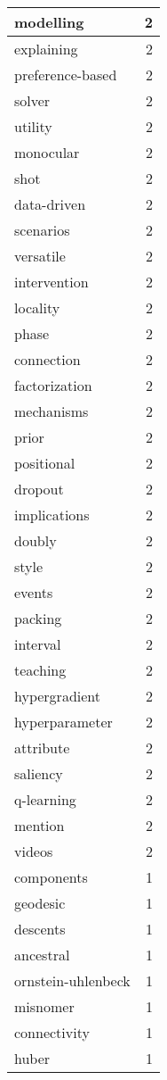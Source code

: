 \begin{table}[h]
\begin{tabular}{|l|r|}
modelling & 2 \\
\hline
explaining & 2 \\
\hline
preference-based & 2 \\
\hline
solver & 2 \\
\hline
utility & 2 \\
\hline
monocular & 2 \\
\hline
shot & 2 \\
\hline
data-driven & 2 \\
\hline
scenarios & 2 \\
\hline
versatile & 2 \\
\hline
intervention & 2 \\
\hline
locality & 2 \\
\hline
phase & 2 \\
\hline
connection & 2 \\
\hline
factorization & 2 \\
\hline
mechanisms & 2 \\
\hline
prior & 2 \\
\hline
positional & 2 \\
\hline
dropout & 2 \\
\hline
implications & 2 \\
\hline
doubly & 2 \\
\hline
style & 2 \\
\hline
events & 2 \\
\hline
packing & 2 \\
\hline
interval & 2 \\
\hline
teaching & 2 \\
\hline
hypergradient & 2 \\
\hline
hyperparameter & 2 \\
\hline
attribute & 2 \\
\hline
saliency & 2 \\
\hline
q-learning & 2 \\
\hline
mention & 2 \\
\hline
videos & 2 \\
\hline
components & 1 \\
\hline
geodesic & 1 \\
\hline
descents & 1 \\
\hline
ancestral & 1 \\
\hline
ornstein-uhlenbeck & 1 \\
\hline
misnomer & 1 \\
\hline
connectivity & 1 \\
\hline
huber & 1 \\

\end{tabular}
\end{table}
